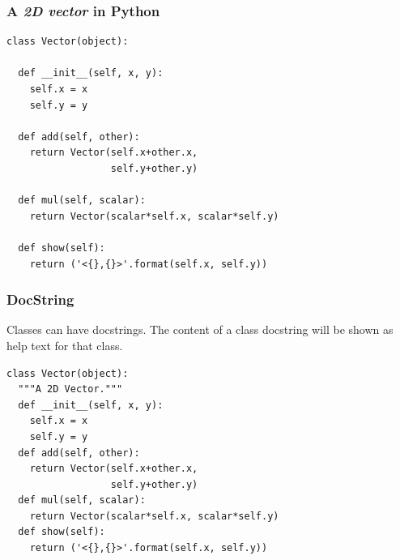 \begin{frame}[fragile]\frametitle{A \emph{2D vector} in Python}
\begin{lstlisting}
class Vector(object):
 
  def __init__(self, x, y):
    self.x = x
    self.y = y
    
  def add(self, other):
    return Vector(self.x+other.x,
                  self.y+other.y)
                  
  def mul(self, scalar):
    return Vector(scalar*self.x, scalar*self.y)
    
  def show(self):
    return ('<{},{}>'.format(self.x, self.y))

\end{lstlisting}
\end{frame}



\begin{frame}[fragile]\frametitle{DocString}
      Classes can have docstrings.
      The content of a class docstring will be shown as help text for
      that class.
\begin{lstlisting}
class Vector(object):
  """A 2D Vector."""
  def __init__(self, x, y):
    self.x = x
    self.y = y
  def add(self, other):
    return Vector(self.x+other.x,
                  self.y+other.y)
  def mul(self, scalar):
    return Vector(scalar*self.x, scalar*self.y)
  def show(self):
    return ('<{},{}>'.format(self.x, self.y))
\end{lstlisting}

\end{frame}


